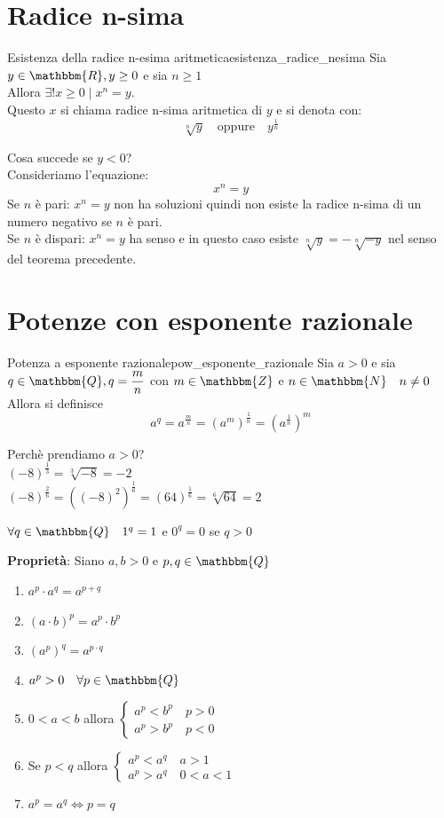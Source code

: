 \documentclass[12pt]{report}
\newcounter{theorem}
\newcounter{definition}
\newcommand{\nmu}{}
\begin{document}
	\section{Radice n-sima}
	\begin{theorem}{Esistenza della radice n-esima aritmetica}{esistenza_radice_nesima}
		Sia $y \in \mathbbm{R}, y \geq 0$ e sia $n \geq 1$ \\
		Allora $\exists! x \geq 0 \mid x^n = y$. \\
		Questo $x$ si chiama radice n-sima aritmetica di $y$ e si denota con:
		\[
		\sqrt[n]{y} \quad \text{oppure} \quad y^{\frac{1}{n}}
		\]
	\end{theorem}
	\begin{note}{}{}
		Cosa succede se $y < 0$? \\
		Consideriamo l'equazione:
		\[
		x^n = y
		\]
		Se $n$ è pari: $x^n = y$ non ha soluzioni quindi non esiste la radice n-sima di un numero negativo se $n$ è pari. \\
		Se $n$ è dispari: $x^n = y$ ha senso e in questo caso esiste $\sqrt[n]{y} = -\sqrt[n]{-y}$ nel senso del teorema precedente.
	\end{note}
	\section{Potenze con esponente razionale}
	\begin{definition}{\nmu Potenza a esponente razionale}{pow_esponente_razionale}
		Sia $a > 0$ e sia $q \in \mathbbm{Q}, q = \dfrac{m}{n}$ con $m \in \mathbbm{Z}$ e $n \in \mathbbm{N} \quad n \neq 0$ \\
		Allora si definisce
		\[
		a^q = a^{\frac{m}{n}} = (a^m)^{\frac{1}{n}} = (a^{\frac{1}{n}})^m
		\]
	\end{definition}
	Perchè prendiamo $a > 0$? \\
	$(-8)^\frac{1}{3} = \sqrt[3]{-8} = -2$ \\
	$(-8)^\frac{2}{6} = ((-8)^2)^\frac{1}{6} = (64)^\frac{1}{6}=\sqrt[6]{64} = 2$ \\
	\begin{note}{}{}
		$\forall q \in \mathbbm{Q} \quad 1^q = 1$ e $0^q = 0$ se $q > 0$
	\end{note}
	\textbf{Proprietà}: Siano $a,b > 0$ e $p,q \in \mathbbm{Q}$
	\begin{enumerate}
		\item $a^p \cdot a^q = a^{p + q}$
		\item $(a \cdot b)^p = a^p \cdot b^p$
		\item $(a^p)^q = a^{p \cdot q}$
		\item $a^p > 0 \quad \forall p \in \mathbbm{Q}$
		\item $0 < a < b$ allora $\begin{cases}
			a^p < b^p \quad p>0 \\
			a^p > b^p \quad p <0
		\end{cases}$
		\item Se $p < q$ allora $\begin{cases}
			a^p < a^q \quad a>1 \\
			a^p>a^q \quad 0<a<1
		\end{cases}$
		\item $a^p = a^q \iff p = q$
	\end{enumerate}
\end{document}
